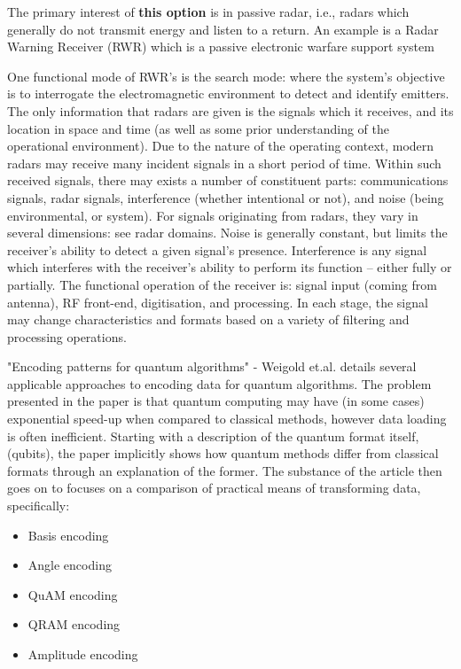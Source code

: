 The primary interest of \textbf{this option} is in passive radar, i.e., radars which generally do not transmit energy and listen to a return. An example is a Radar Warning Receiver (RWR) which is a passive electronic warfare support system \cite{avionics_department_electronic_2013}

One functional mode of RWR's is the search mode: where the system’s objective is to interrogate the electromagnetic environment to detect and identify emitters. The only information that radars are given is the signals which it receives, and its location in space and time (as well as some prior understanding of the operational environment). Due to the nature of the operating context, modern radars may receive many incident signals in a short period of time. Within such received signals, there may exists a number of constituent parts: communications signals, radar signals, interference (whether intentional or not), and noise (being environmental, or system). For signals originating from radars, they vary in several dimensions: see radar domains. Noise is generally constant, but limits the receiver’s ability to detect a given signal’s presence. Interference is any signal which interferes with the receiver’s ability to perform its function – either fully or partially. The functional operation of the receiver is: signal input (coming from antenna), RF front-end, digitisation, and processing. In each stage, the signal may change characteristics and formats based on a variety of filtering and processing operations. \cite{stimson_introduction_1998}

"Encoding patterns for quantum algorithms" - Weigold et.al. \cite{weigold_encoding_2021} details several applicable approaches to encoding data for quantum algorithms. The problem presented in the paper is that quantum computing may have (in some cases) exponential speed-up when compared to classical methods, however data loading is often inefficient. Starting with a description of the quantum format itself, (qubits), the paper implicitly shows how quantum methods differ from classical formats through an explanation of the former. The substance of the article then goes on to focuses on a comparison of practical means of transforming data, specifically:
\begin{itemize}
 \item Basis encoding
 \item Angle encoding
 \item QuAM encoding 
 \item QRAM encoding
 \item Amplitude encoding
\end{itemize}

